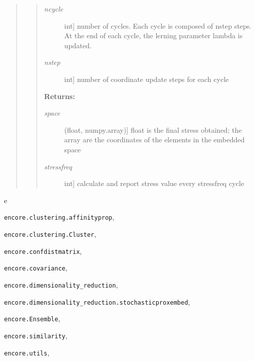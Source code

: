 \documentclass[letterpaper,10pt,english]{sphinxmanual}
\begin{document}
\begin{fulllineitems}
\begin{quote}
\begin{quote}
\begin{description}
\item[{\emph{ncycle}}] \leavevmode{[}int{]}
number of cycles. Each cycle is composed of nstep steps. At the end of each cycle, the lerning parameter lambda is updated.

\item[{\emph{nstep}}] \leavevmode{[}int{]}
number of coordinate update steps for each cycle

\end{description}

\textbf{Returns:}
\begin{description}
\item[{\emph{space}}] \leavevmode{[}(float, numpy.array){]}
float is the final stress obtained; the array are the coordinates of the elements in the embedded space

\item[{\emph{stressfreq}}] \leavevmode{[}int{]}
calculate and report stress value every stressfreq cycle

\end{description}
\end{quote}
\end{quote}

\end{fulllineitems}



\renewcommand{\indexname}{Python Module Index}
\begin{theindex}
\def\bigletter#1{{\Large\sffamily#1}\nopagebreak\vspace{1mm}}
\bigletter{e}
\item {\texttt{encore.clustering.affinityprop}}, \pageref{index:module-encore.clustering.affinityprop}
\item {\texttt{encore.clustering.Cluster}}, \pageref{index:module-encore.clustering.Cluster}
\item {\texttt{encore.confdistmatrix}}, \pageref{index:module-encore.confdistmatrix}
\item {\texttt{encore.covariance}}, \pageref{index:module-encore.covariance}
\item {\texttt{encore.dimensionality\_reduction}}, \pageref{index:module-encore.dimensionality_reduction}
\item {\texttt{encore.dimensionality\_reduction.stochasticproxembed}}, \pageref{index:module-encore.dimensionality_reduction.stochasticproxembed}
\item {\texttt{encore.Ensemble}}, \pageref{index:module-encore.Ensemble}
\item {\texttt{encore.similarity}}, \pageref{index:module-encore.similarity}
\item {\texttt{encore.utils}}, \pageref{index:module-encore.utils}
\end{theindex}

\renewcommand{\indexname}{Index}
\printindex
\end{document}
